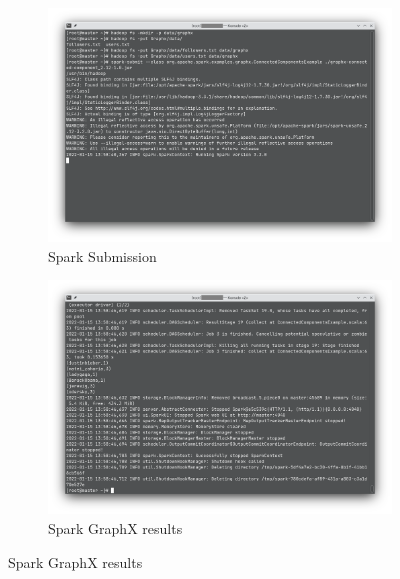 \begin{figure}[ht]
     \begin{subfigure}[b]{0.48\textwidth}
         \centering
    \includegraphics[width=\textwidth]{figure/spark-submit.png}
    \caption{Spark Submission}
    \label{fig:spark-submit}
     \end{subfigure}
     \begin{subfigure}[b]{0.48\textwidth}
         \centering
    \includegraphics[width=\textwidth]{figure/spark-result.png}
    \caption{Spark GraphX results}
    \label{fig:spark-result}
     \end{subfigure}
     

\end{figure}
